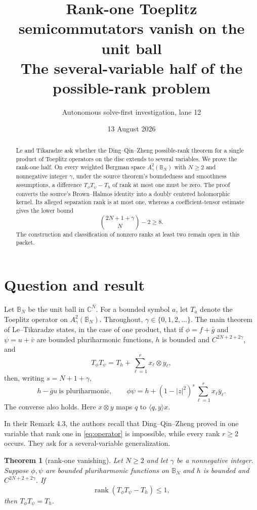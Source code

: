 \documentclass[11pt]{article}
\title{Rank-one Toeplitz semicommutators vanish on the unit ball\\
\large The several-variable half of the possible-rank problem}
\author{Autonomous solve-first investigation, lane 12}
\date{13 August 2026}
\newtheorem{theorem}{Theorem}
\newcommand{\B}{\mathbb B}
\newcommand{\C}{\mathbb C}
\begin{document}
\maketitle

\begin{abstract}
Le and Tikaradze ask whether the Ding--Qin--Zheng possible-rank theorem for a
single product of Toeplitz operators on the disc extends to several
variables.  We prove the rank-one half.  On every weighted Bergman space
$A^2_\gamma(\B_N)$ with $N\ge2$ and nonnegative integer $\gamma$, under the
source theorem's boundedness and smoothness assumptions, a difference
$T_\phi T_\psi-T_h$ of rank at most one must be zero.  The proof converts the
source's Brown--Halmos identity into a doubly centered holomorphic kernel.
Its alleged separation rank is at most one, whereas a coefficient-tensor
estimate gives the lower bound
\[
 \binom{2N+1+\gamma}{N}-2\ge8.
\]
The construction and classification of nonzero ranks at least two remain
open in this packet.
\end{abstract}

\section{Question and result}

Let $\B_N$ be the unit ball in $\C^N$.  For a bounded symbol $a$, let $T_a$
denote the Toeplitz operator on $A^2_\gamma(\B_N)$.  Throughout,
$\gamma\in\{0,1,2,\ldots\}$.  The main theorem of Le--Tikaradze \cite{LT}
states, in the case of one product, that if $\phi=f+\bar g$ and
$\psi=u+\bar v$ are bounded pluriharmonic functions, $h$ is bounded and
$C^{2N+2+2\gamma}$, and
\begin{equation}\label{eq:operator}
 T_\phi T_\psi=T_h+\sum_{\ell=1}^r x_\ell\otimes y_\ell,
\end{equation}
then, writing $s=N+1+\gamma$,
\begin{equation}\label{eq:BH}
 h-\bar g u\ \text{is pluriharmonic},\qquad
 \phi\psi=h+(1-|z|^2)^s\sum_{\ell=1}^r x_\ell\bar y_\ell.
\end{equation}
The converse also holds.  Here $x\otimes y$ maps $q$ to
$\langle q,y\rangle x$.

In their Remark 4.3, the authors recall that Ding--Qin--Zheng \cite{DQZ}
proved in one variable that rank one in \eqref{eq:operator} is impossible,
while every rank $r\ge2$ occurs.  They ask for a several-variable
generalization.

\begin{theorem}[rank-one vanishing]\label{thm:main}
Let $N\ge2$ and let $\gamma$ be a nonnegative integer.  Suppose $\phi,\psi$
are bounded pluriharmonic functions on $\B_N$ and $h$ is bounded and
$C^{2N+2+2\gamma}$.  If
\[
 \operatorname{rank}(T_\phi T_\psi-T_h)\le1,
\]
then $T_\phi T_\psi=T_h$.
\end{theorem}
\end{document}
